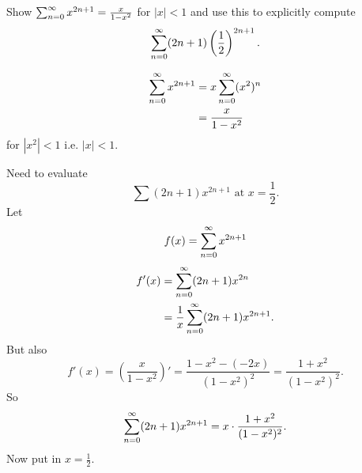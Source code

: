 \documentclass[10pt, a4paper]{article}
\begin{document}
\begin{problem}[6]
    Show $\infsum[n = 0]x ^ {2n + 1} = \frac{x}{1 - x ^ 2}$ for $|x| < 1$ and use this to explicitly compute
    \[
    \infsum[n = 0](2n + 1)\left(\frac{1}{2}\right) ^ {2n + 1}.
    \]

    \begin{solution}
        \begin{align*}
            \infsum[n = 0]x ^ {2n + 1} &= x\infsum[n = 0](x ^ 2) ^ n \\
            &= \frac{x}{1 - x ^ 2}
        \end{align*}
        for $|x ^ 2| < 1$ i.e. $|x| < 1$.

        Need to evaluate
        \[
        \sum(2n + 1)x ^ {2n + 1}\text{ at $x = \frac{1}{2}$}.
        \]
        Let
        \[
        f(x) = \infsum[n = 0]x ^ {2n + 1}
        \]
        \begin{align*}
            f'(x) &= \infsum[n = 0](2n + 1)x ^ {2n} \\
            &= \frac{1}{x}\infsum[n = 0](2n + 1)x ^ {2n + 1}.
        \end{align*}
        But also
        \[
        f'(x) = \left(\frac{x}{1 - x ^ 2}\right)' = \frac{1 - x ^ 2 - (-2x)}{(1 - x ^ 2) ^ 2} = \frac{1 + x ^ 2}{(1 - x ^ 2) ^ 2}.
        \]
        So
        \[
        \infsum[n = 0](2n + 1)x ^ {2n + 1} = x \cdot \frac{1 + x ^ 2}{(1 - x ^ 2) ^ 2}.
        \]
        Now put in $x = \frac{1}{2}$.
    \end{solution}
\end{problem}
\end{document}
